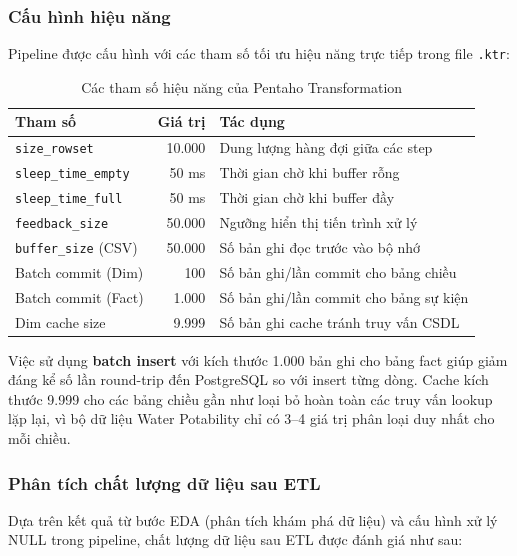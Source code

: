 \subsubsection{Cấu hình hiệu năng}

Pipeline được cấu hình với các tham số tối ưu hiệu năng trực tiếp trong file \texttt{.ktr}:

\begin{table}[H]
\centering
\caption{Các tham số hiệu năng của Pentaho Transformation}
\label{tab:perf_params}
\begin{tabular}{lrp{6cm}}
\hline
\textbf{Tham số} & \textbf{Giá trị} & \textbf{Tác dụng} \\
\hline
\texttt{size\_rowset} & 10.000 & Dung lượng hàng đợi giữa các step \\
\texttt{sleep\_time\_empty} & 50 ms & Thời gian chờ khi buffer rỗng \\
\texttt{sleep\_time\_full} & 50 ms & Thời gian chờ khi buffer đầy \\
\texttt{feedback\_size} & 50.000 & Ngưỡng hiển thị tiến trình xử lý \\
\texttt{buffer\_size} (CSV) & 50.000 & Số bản ghi đọc trước vào bộ nhớ \\
Batch commit (Dim) & 100 & Số bản ghi/lần commit cho bảng chiều \\
Batch commit (Fact) & 1.000 & Số bản ghi/lần commit cho bảng sự kiện \\
Dim cache size & 9.999 & Số bản ghi cache tránh truy vấn CSDL \\
\hline
\end{tabular}
\end{table}

Việc sử dụng \textbf{batch insert} với kích thước 1.000 bản ghi cho bảng fact giúp giảm đáng kể số lần round-trip đến PostgreSQL so với insert từng dòng. Cache kích thước 9.999 cho các bảng chiều gần như loại bỏ hoàn toàn các truy vấn lookup lặp lại, vì bộ dữ liệu Water Potability chỉ có 3--4 giá trị phân loại duy nhất cho mỗi chiều.

\subsubsection{Phân tích chất lượng dữ liệu sau ETL}

Dựa trên kết quả từ bước EDA (phân tích khám phá dữ liệu) và cấu hình xử lý NULL trong pipeline, chất lượng dữ liệu sau ETL được đánh giá như sau:


